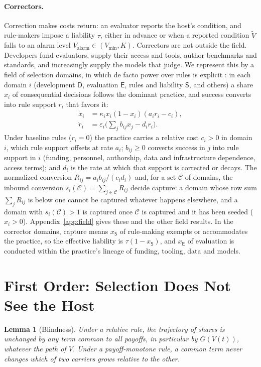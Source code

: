 \documentclass[letterpaper]{article} %
\newtheorem{lemma}{Lemma}
\theoremstyle{definition}
\newcommand{\dD}{\mathsf{D}}
\newcommand{\dE}{\mathsf{E}}
\newcommand{\dS}{\mathsf{S}}
\newcommand{\cC}{\mathcal{C}}
\newcommand{\Valarm}{V_{\mathrm{alarm}}}
\newcommand{\Vmin}{V_{\min}}
\begin{document}
\paragraph{Correctors.} Correction makes costs return: an evaluator reports the host's condition, and rule-makers impose a liability $\tau$, either in advance or when a reported condition $\tilde V$ falls to an alarm level $\Valarm\in(\Vmin,K)$. Correctors are not outside the field. Developers fund evaluators, supply their access and tools, author benchmarks and standards, and increasingly supply the models that judge. We represent this by a field of selection domains, in which de facto power over rules is explicit \citep{acemoglu2008}: in each domain $i$ (development $\dD$, evaluation $\dE$, rules and liability $\dS$, and others) a share $x_i$ of consequential decisions follows the dominant practice, and success converts into rule support $r_i$ that favors it:
\begin{align}
\dot x_i&=\kappa_ix_i(1-x_i)(a_ir_i-c_i),\label{eq:x}\\
\dot r_i&=\varepsilon_i\Big(\textstyle\sum_jb_{ij}x_j-d_ir_i\Big).\label{eq:r}
\end{align}
Under baseline rules ($r_i=0$) the practice carries a relative cost $c_i>0$ in domain $i$, which rule support offsets at rate $a_i$; $b_{ij}\ge0$ converts success in $j$ into rule support in $i$ (funding, personnel, authorship, data and infrastructure dependence, access terms); and $d_i$ is the rate at which that support is corrected or decays. The normalized conversion $R_{ij}=a_ib_{ij}/(c_id_i)$ and, for a set $\cC$ of domains, the inbound conversion $s_i(\cC)=\sum_{j\in\cC}R_{ij}$ decide capture: a domain whose row sum $\sum_jR_{ij}$ is below one cannot be captured whatever happens elsewhere, and a domain with $s_i(\cC)>1$ is captured once $\cC$ is captured and it has been seeded ($x_i>0$). Appendix~\ref{app:field} gives these and the other field results. In the corrector domains, capture means $x_\dS$ of rule-making exempts or accommodates the practice, so the effective liability is $\tau(1-x_\dS)$, and $x_\dE$ of evaluation is conducted within the practice's lineage of funding, tooling, data and models.

\section{First Order: Selection Does Not See the Host}\label{sec:first}

\begin{lemma}[Blindness]\label{lem:blind}
Under a relative rule, the trajectory of shares is unchanged by any term common to all payoffs, in particular by $G(V(t))$, whatever the path of $V$. Under a payoff-monotone rule, a common term never changes which of two carriers grows relative to the other.
\end{lemma}
\end{document}
